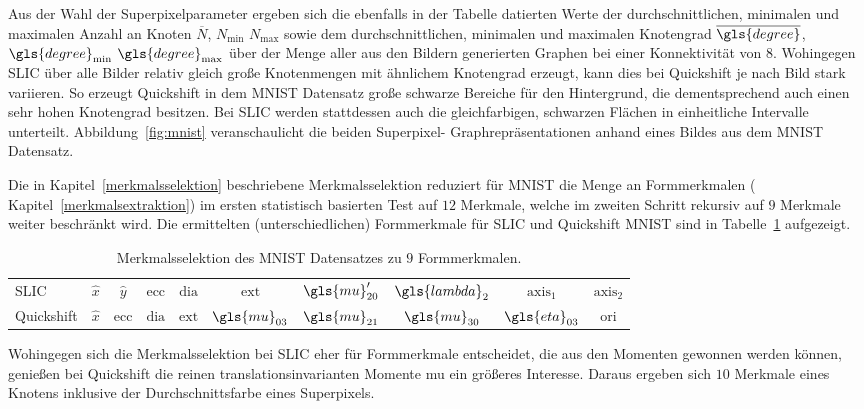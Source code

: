 Aus der Wahl der Superpixelparameter ergeben sich die ebenfalls in der Tabelle datierten Werte der durchschnittlichen, minimalen und maximalen Anzahl an Knoten $\overline{N}$, $N_{\min}$ \bzw{} $N_{\max}$ sowie dem durchschnittlichen, minimalen und maximalen Knotengrad $\overline{\gls{degree}}$, $\gls{degree}_{\min}$ \bzw{} $\gls{degree}_{\max}$ über der Menge aller aus den Bildern generierten Graphen bei einer Konnektivität von $8$.
Wohingegen \gls{SLIC} über alle Bilder relativ gleich große Knotenmengen mit ähnlichem Knotengrad erzeugt, kann dies bei Quickshift je nach Bild stark variieren.
So erzeugt Quickshift in dem \gls{MNIST} Datensatz \bspw{} große schwarze Bereiche für den Hintergrund, die dementsprechend auch einen sehr hohen Knotengrad besitzen.
Bei \gls{SLIC} werden stattdessen auch die gleichfarbigen, schwarzen Flächen in einheitliche Intervalle unterteilt.
Abbildung~\ref{fig:mnist} veranschaulicht die beiden Superpixel- \bzw{} Graphrepräsentationen anhand eines Bildes aus dem \gls{MNIST} Datensatz.


Die in Kapitel~\ref{merkmalsselektion} beschriebene Merkmalsselektion reduziert für \gls{MNIST} die Menge an Formmerkmalen (\vgl{} Kapitel~\ref{merkmalsextraktion}) im ersten statistisch basierten Test auf $12$ Merkmale, welche im zweiten Schritt rekursiv auf $9$ Merkmale weiter beschränkt wird.
Die ermittelten (unterschiedlichen) Formmerkmale für \gls{SLIC} und Quickshift \bzgl{} \gls{MNIST} sind in Tabelle~\ref{tab:mnist_merkmale} aufgezeigt.
\begin{table}[t]
\centering
\begin{tabular}{lccccccccc}
  \toprule
  \gls{SLIC} & $\hat{x}$ & $\hat{y}$ & $\mathrm{ecc}$ & $\mathrm{dia}$ & $\mathrm{ext}$ & $\gls{mu}^{\prime}_{20}$ & $\gls{lambda}_2$ & $\mathrm{axis}_1$ & $\mathrm{axis}_2$\\
  Quickshift & $\hat{x}$ & $\mathrm{ecc}$ & $\mathrm{dia}$ & $\mathrm{ext}$ & $\gls{mu}_{03}$ & $\gls{mu}_{21}$ & $\gls{mu}_{30}$ & $\gls{eta}_{03}$ & $\mathrm{ori}$\\
  \bottomrule
\end{tabular}
  \caption[\gls{MNIST} Merkmalsselektion]{Merkmalsselektion des \gls{MNIST} Datensatzes zu $9$ Formmerkmalen.}
\label{tab:mnist_merkmale}
\end{table}
Wohingegen sich die Merkmalsselektion bei \gls{SLIC} eher für Formmerkmale entscheidet, die aus den Momenten gewonnen werden können, genießen bei Quickshift die reinen translationsinvarianten Momente \gls{mu} ein größeres Interesse.
Daraus ergeben sich $10$ Merkmale eines Knotens inklusive der Durchschnittsfarbe eines Superpixels.

